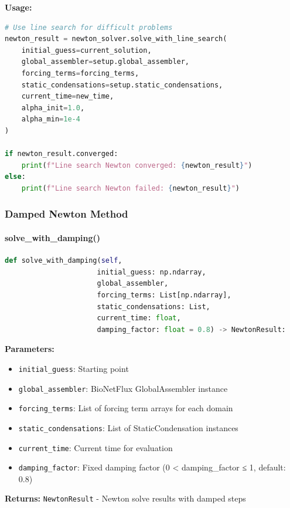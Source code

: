 \textbf{Usage:}
\begin{lstlisting}[language=Python, caption=Line Search Newton Usage]
# Use line search for difficult problems
newton_result = newton_solver.solve_with_line_search(
    initial_guess=current_solution,
    global_assembler=setup.global_assembler,
    forcing_terms=forcing_terms,
    static_condensations=setup.static_condensations,
    current_time=new_time,
    alpha_init=1.0,
    alpha_min=1e-4
)

if newton_result.converged:
    print(f"Line search Newton converged: {newton_result}")
else:
    print(f"Line search Newton failed: {newton_result}")
\end{lstlisting}

\subsubsection{Damped Newton Method}

\paragraph{solve\_with\_damping()}\leavevmode
\begin{lstlisting}[language=Python, caption=Damped Newton Method]
def solve_with_damping(self,
                      initial_guess: np.ndarray,
                      global_assembler,
                      forcing_terms: List[np.ndarray],
                      static_condensations: List,
                      current_time: float,
                      damping_factor: float = 0.8) -> NewtonResult:
\end{lstlisting}

\textbf{Parameters:}
\begin{itemize}
    \item \texttt{initial\_guess}: Starting point
    \item \texttt{global\_assembler}: BioNetFlux GlobalAssembler instance
    \item \texttt{forcing\_terms}: List of forcing term arrays for each domain
    \item \texttt{static\_condensations}: List of StaticCondensation instances
    \item \texttt{current\_time}: Current time for evaluation
    \item \texttt{damping\_factor}: Fixed damping factor (0 < damping\_factor ≤ 1, default: 0.8)
\end{itemize}

\textbf{Returns:} \texttt{NewtonResult} - Newton solve results with damped steps

